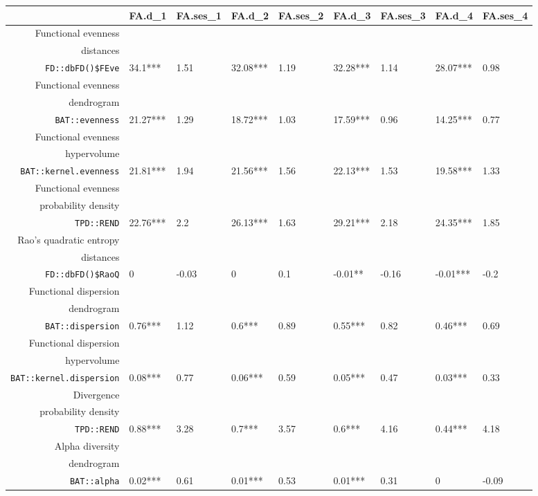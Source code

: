 \begin{table}[ht]
\scriptsize
\centering
\begin{tabular}{rllllllll}
  \hline
 & FA.d\_1 & FA.ses\_1 & FA.d\_2 & FA.ses\_2 & FA.d\_3 & FA.ses\_3 & FA.d\_4 & FA.ses\_4 \\ 
  \hline
Functional evenness\\distances\\\texttt{FD::dbFD()\$FEve} & 34.1*** & 1.51 & 32.08*** & 1.19 & 32.28*** & 1.14 & 28.07*** & 0.98 \\ 
  Functional evenness\\dendrogram\\\texttt{BAT::evenness} & 21.27*** & 1.29 & 18.72*** & 1.03 & 17.59*** & 0.96 & 14.25*** & 0.77 \\ 
  Functional evenness\\hypervolume\\\texttt{BAT::kernel.evenness} & 21.81*** & 1.94 & 21.56*** & 1.56 & 22.13*** & 1.53 & 19.58*** & 1.33 \\ 
  Functional evenness\\probability density\\\texttt{TPD::REND} & 22.76*** & 2.2 & 26.13*** & 1.63 & 29.21*** & 2.18 & 24.35*** & 1.85 \\ 
  Rao's quadratic entropy\\distances\\\texttt{FD::dbFD()\$RaoQ} & 0 & -0.03 & 0 & 0.1 & -0.01** & -0.16 & -0.01*** & -0.2 \\ 
  Functional dispersion\\dendrogram\\\texttt{BAT::dispersion} & 0.76*** & 1.12 & 0.6*** & 0.89 & 0.55*** & 0.82 & 0.46*** & 0.69 \\ 
  Functional dispersion\\hypervolume\\\texttt{BAT::kernel.dispersion} & 0.08*** & 0.77 & 0.06*** & 0.59 & 0.05*** & 0.47 & 0.03*** & 0.33 \\ 
  Divergence\\probability density\\\texttt{TPD::REND} & 0.88*** & 3.28 & 0.7*** & 3.57 & 0.6*** & 4.16 & 0.44*** & 4.18 \\ 
  Alpha diversity\\dendrogram\\\texttt{BAT::alpha} & 0.02*** & 0.61 & 0.01*** & 0.53 & 0.01*** & 0.31 & 0 & -0.09 \\ 

\end{tabular}
\end{table}
